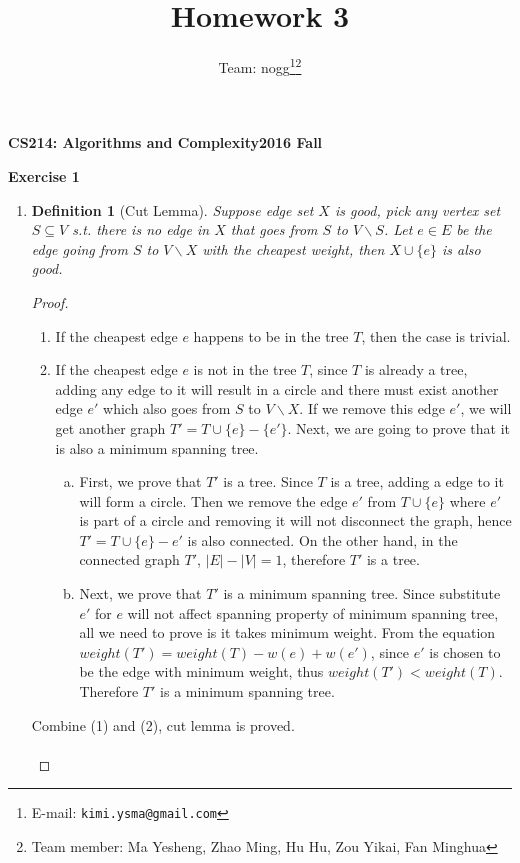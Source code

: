 \documentclass[12pt, notitlepage]{article}
\title{Homework 3}
\author{Team: nogg\footnote{E-mail: \texttt{kimi.ysma@gmail.com}}\footnote{Team member: Ma Yesheng, Zhao Ming, Hu Hu, Zou Yikai, Fan Minghua}}
\newtheorem{defi}{Definition}
\begin{document}
{\bf\small CS214: Algorithms and Complexity}\hfill{\bf\small 2016 Fall}
{\let\newpage\relax\maketitle}


\textbf{Exercise 1}
\begin{enumerate}
\item
\begin{defi}[Cut Lemma]
\vspace{-0.85cm}
Suppose edge set $X$ is good, pick any vertex set $S\subseteq V$ s.t. there is no edge in $X$ that goes from $S$ to $V\backslash S$. Let $e\in E$ be the edge going from $S$ to  $V\backslash X$ with the cheapest weight, then $X\cup \{e\}$ is also good.
\end{defi}
\begin{proof}
	\mbox{ }
\begin{enumerate}[(1)]
	\item If the cheapest edge $e$ happens to be in the tree $T$, then the case is trivial.
	\item If the cheapest edge $e$ is not in the tree $T$, since $T$ is already a tree, adding any edge to it will result in a circle and there must exist another edge $e'$ which also goes from $S$ to  $V\backslash X$. If we remove this edge $e'$, we will get another graph $T' = T\cup \{e\} -\{e'\}$. Next, we are going to prove that it is also a minimum spanning tree.
	\begin{enumerate}[(a)]
		\item First, we prove that $T'$ is a tree. Since $T$ is a tree, adding a edge to it will form a circle. Then we remove the  edge $e'$ from $T\cup\{e\}$ where $e'$ is part of a circle and removing it will not disconnect the graph, hence $T' = T\cup\{e\} - e'$ is also connected. On the other hand, in the connected graph $T'$, $|E|-|V| = 1$, therefore $T'$ is a tree.
		\item Next, we prove that $T'$ is a minimum spanning tree. Since substitute $e'$ for $e$ will not affect spanning property of minimum spanning tree, all we need to prove is it takes minimum weight. From the equation $weight(T') = weight(T)-w(e)+w(e')$, since $e'$ is chosen to be the edge with minimum weight, thus $weight(T') < weight(T)$. Therefore $T'$ is a minimum spanning tree.
		
	\end{enumerate}
\end{enumerate}
Combine (1) and (2), cut lemma is proved.\\\\
\end{proof}


\end{enumerate}
\end{document}

